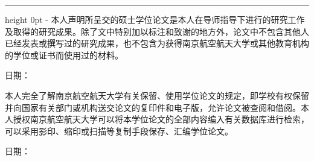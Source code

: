 \clearpage\thispagestyle{empty}
\begingroup\linespread{1}\songti\fontsize{16bp}{31.2bp}\selectfont
\setlength{\parindent}{2\ccwd}\setlength{\parskip}{0pt}
\hrule height 0pt
\kern{}-\topskip\relax
{}
\kern-13.13bp
\nointerlineskip\noindent\hspace*{2\ccwd}本人声明所呈交的硕士学位论文是本人在导师指导下进行的研究工作及取得的研究成果。除了文中特别加以标注和致谢的地方外，论文中不包含其他人已经发表或撰写过的研究成果，也不包含为获得南京航空航天大学或其他教育机构的学位或证书而使用过的材料。
\par\vspace{7.8bp}\indent {}日期：\underline{\hspace{112bp}}
\par\vspace{92.56bp}
\kern-13.13bp
\nointerlineskip\noindent\hspace*{2\ccwd}本人完全了解南京航空航天大学有关保留、使用学位论文的规定，即学校有权保留并向国家有关部门或机构送交论文的复印件和电子版，允许论文被查阅和借阅。本人授权南京航空航天大学可以将本学位论文的全部内容编入有关数据库进行检索，可以采用影印、缩印或扫描等复制手段保存、汇编学位论文。
\par\vspace{7.8bp}\indent {}%
日期：\underline{\hspace{56bp}}
\par\endgroup\clearpage


\frontmatter
{}
\pagestyle{thesis}
\begingroup
  \titleformat{\chapter}{\centering\WordHei\fontsize{15bp}{20bp}\selectfont}{}{0pt}{}
  \titlespacing*{\chapter}{0pt}{-8.786bp}{-13.84bp}
